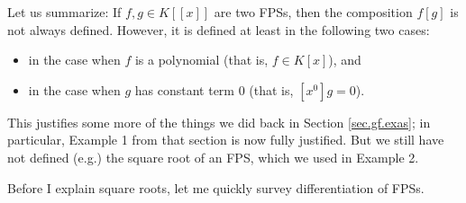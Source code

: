 Let us summarize: If $f,g\in K\left[  \left[  x\right]  \right]  $ are two
FPSs, then the composition $f\left[  g\right]  $ is not always defined.
However, it is defined at least in the following two cases:

\begin{itemize}
\item in the case when $f$ is a polynomial (that is, $f\in K\left[  x\right]
$), and

\item in the case when $g$ has constant term $0$ (that is, $\left[
x^{0}\right]  g=0$).
\end{itemize}

This justifies some more of the things we did back in Section
\ref{sec.gf.exas}; in particular, Example 1 from that section is now fully
justified. But we still have not defined (e.g.) the square root of an FPS,
which we used in Example 2.

Before I explain square roots, let me quickly survey differentiation of FPSs.
